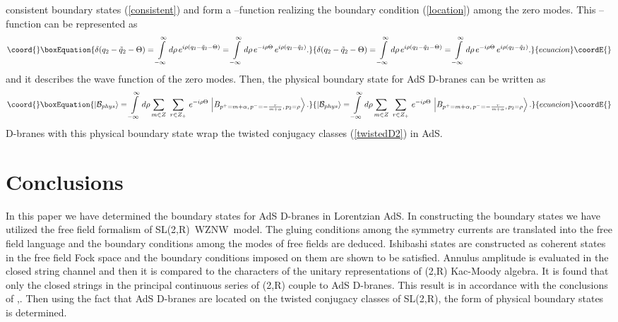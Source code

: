 \documentclass[a4paper,12pt]{article}
\begin{document}
consistent boundary states (\ref{consistent}) and form a \myHighlight{$\delta $}\coordHE{}--function
realizing the boundary condition (\ref{location}) among the zero modes. This
\myHighlight{$\delta $}\coordHE{}--function can be represented as
\begin{equation}\coord{}\boxEquation{
\delta (q_{2}-\tilde{q}_{2}-\Theta )=\int\limits_{-\infty }^{\infty }d\rho
\,e^{i\rho (q_{2}-\tilde{q}_{2}-\Theta )}=\int\limits_{-\infty }^{\infty
}d\rho \,e^{-i\rho \Theta }\,e^{i\rho (q_{2}-\tilde{q}_{2})}.  \label{delta}
}{
\delta (q_{2}-\tilde{q}_{2}-\Theta )=\int\limits_{-\infty }^{\infty }d\rho
\,e^{i\rho (q_{2}-\tilde{q}_{2}-\Theta )}=\int\limits_{-\infty }^{\infty
}d\rho \,e^{-i\rho \Theta }\,e^{i\rho (q_{2}-\tilde{q}_{2})}.  }{ecuacion}\coordE{}\end{equation}
and it describes the wave function of the zero modes. Then, the physical
boundary state for AdS\coordHE{} D-branes can be written as
\begin{equation}\coord{}\boxEquation{
\left| \mathcal{B}_{phys}\right\rangle =\int\limits_{-\infty }^{\infty
}d\rho \sum_{m\in Z}\ \sum_{r\in Z_{+}}\,e^{-i\rho \Theta }\,\left|
B_{p^{+}=m+\alpha ,\,p^{-}=-\frac{r}{m+\alpha },\,p_{2}=\rho }\right\rangle .
\label{physB}
}{
\left| \mathcal{B}_{phys}\right\rangle =\int\limits_{-\infty }^{\infty
}d\rho \sum_{m\in Z}\ \sum_{r\in Z_{+}}\,e^{-i\rho \Theta }\,\left|
B_{p^{+}=m+\alpha ,\,p^{-}=-\frac{r}{m+\alpha },\,p_{2}=\rho }\right\rangle .
}{ecuacion}\coordE{}\end{equation}
D-branes with this physical boundary state wrap the twisted conjugacy
classes (\ref{twistedD2}) in AdS\coordHE{}.

\section{Conclusions}

In this paper we have determined the boundary states for AdS\coordHE{}
D-branes in Lorentzian AdS\coordHE{}. In constructing the boundary
states we have utilized the free field formalism of SL(2,R)\ WZNW\
model. The gluing conditions among the symmetry currents are
translated into the free field language and the boundary
conditions among the modes of free fields are deduced. Ishibashi
states are constructed as coherent states in the free field Fock
space and the boundary conditions imposed on them are shown to be
satisfied. Annulus amplitude is evaluated in the closed string
channel and then it is
compared to the characters of the unitary representations of \myHighlight{$\widehat{%
\mathtt{sl}}$}\coordHE{}(2,R) Kac-Moody algebra. It is found that only the
closed strings in the principal continuous series of
\coordHE{}(2,R) couple to AdS\coordHE{} D-branes. This
result is in accordance with the conclusions of
\cite{bars1},\cite{BDM}. Then using the fact that AdS\coordHE{}
D-branes are located on the twisted conjugacy classes of SL(2,R),
the form of physical boundary states is determined.
\end{document}

